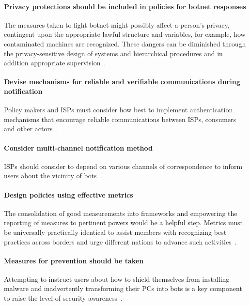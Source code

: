 \paragraph{Privacy protections should be included in policies for botnet responses}
The measures taken to fight botnet might possibly affect a person’s privacy, contingent upon the appropriate lawful structure and variables, for example, how contaminated machines are recognized. These dangers can be diminished through the privacy-sensitive design of systems and hierarchical procedures and in addition appropriate supervision~\cite{OECD}.


\paragraph{Devise mechanisms for reliable and verifiable communications during notification}
Policy makers and ISPs must consider how best to implement authentication mechanisms that encourage reliable communications between ISPs, consumers and other actors~\cite{OECD}.

\paragraph{Consider multi-channel notification method}
ISPs should consider to depend on various channels of correspondence to inform users about the vicinity of bots~\cite{OECD}.

\paragraph{Design policies using effective metrics}
The consolidation of good measurements into frameworks and empowering the reporting of measures to pertinent powers would be a helpful step. Metrics must be universally practically identical to assist members with recognizing best practices across borders and urge different nations to advance such activities~\cite{OECD}.

\paragraph{Measures for prevention should be taken}
Attempting to instruct users about how to shield themselves from installing malware and inadvertently transforming their PCs into bots is a key component to raise the level of security awareness~\cite{OECD}.

